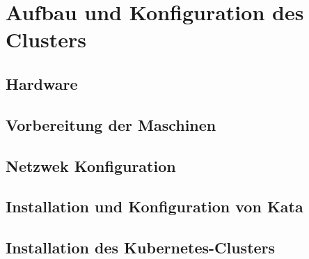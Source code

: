 \chapter{Aufbau und Konfiguration des Clusters}

\section{Hardware}

\section{Vorbereitung der Maschinen}

\section{Netzwek Konfiguration}

\section{Installation und Konfiguration von Kata}

\section{Installation des Kubernetes-Clusters}

